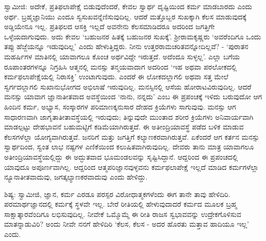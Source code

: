 ಸ್ವಾಮೀಜಿ: ಅದೇಕೆ, ಪ್ರತಿಫಲಾಪೇಕ್ಷೆ ಬಿಡುವುದೆಂದರೆ, ಕೇವಲ ಸ್ವಾರ್ಥ ದೃಷ್ಟಿಯಿಂದ ಕರ್ಮ ಮಾಡಬಾರದು ಎಂದು ಅರ್ಥ. ಬ್ರಹ್ಮಜ್ಞಾನಿಯು ಎಂದೂ ಸ್ವಸುಖವನ್ನೆಣಿಸುವುದಿಲ್ಲ. ಆದರೆ ಮತ್ತೊಬ್ಬರ ಸುಖಕ್ಕಾಗಿ ಕೆಲಸ ಮಾಡುವುದಕ್ಕೆ ಅಡ್ಡಿಯೇನೂ ಇಲ್ಲ. ಪ್ರತಿಫಲದ ಆಸಕ್ತಿ ಇಲ್ಲದೆ ಅವನೇನು ಕೆಲಸಮಾಡಿದರೂ ಅದರಿಂದ ಜಗತ್ತಿಗೇ ಒಳ್ಳೆಯದಾಗುವುದು. ಅದು ಕೇವಲ ‘ಬಹುಜನರ ಹಿತಕ್ಕೆ ಬಹುಜನರ ಸುಖಕ್ಕೆ’. ಶ‍್ರೀರಾಮಕೃಷ್ಣರು ‘ಅವರೆಂದಿಗೂ ಒಂದು ತಪ್ಪು ಹೆಜ್ಜೆಯನ್ನೂ ಇಡುವುದಿಲ್ಲ’ ಎಂದು ಹೇಳುತ್ತಿದ್ದರು. ನೀನು ಉತ್ತರರಾಮಚರಿತವನ್ನೋದಿಲ್ಲವೆ? - ‘ಪುರಾತನ ಮಹರ್ಷಿಗಳ ಮಾತಿನಲ್ಲಿ ಯಾವಾಗಲೂ ಕೊಂಚ ಅರ್ಥವಿದ್ದೇ ಇರುತ್ತದೆ. ಅದೆಂದೂ ಸುಳ್ಳಲ್ಲ’. ಎಲ್ಲಾ ಬಗೆಯ ರೂಪಾಂತರಗಳನ್ನೂ ನಿಗ್ರಹಿಸಿ ಆತ್ಮನಲ್ಲಿ ಮನಸ್ಸು ತನ್ಮಯವಾದಾಗ ಅದರಿಂದ ‘ಇಹ ಅಥವಾ ಪರಲೋಕದಲ್ಲಿ ಕರ್ಮಫಲಾಪೇಕ್ಷೆಯಲ್ಲಿ ನಿರಾಸಕ್ತಿ’ ಉಂಟಾಗುವುದು. ಎಂದರೆ ಈ ಲೋಕದಲ್ಲಾಗಲಿ ಅಥವಾ ಸತ್ತ ಮೇಲೆ ಸ್ವರ್ಗದಲ್ಲಾಗಲಿ ಸುಖಾನುಭೋಗದ ಅಭಿಲಾಷೆ ಇರುವುದಿಲ್ಲ. ಮನಸ್ಸಿನಲ್ಲಿ ಆಸೆಯ ಹೋರಾಟವಿರುವುದಿಲ್ಲ. ಆದರೆ ಮನಸ್ಸು ಯಾವಾಗ ಜ್ಞಾನಾತೀತವಾದ ಅವಸ್ಥೆಯಿಂದ ‘ನಾನು, ನನ್ನದು’ ಎಂಬ ಈ ಪ್ರಪಂಚಕ್ಕೆ ಇಳಿದು ಬರುವುದೋ ಆಗ ಹಿಂದಿನ ಕರ್ಮ, ಅಭ್ಯಾಸ, ಸಂಸ್ಕಾರಗಳ ಪರಿಮಾಣಕ್ಕನುಸಾರ ದೇಹದ ಕ್ರಿಯೆಗಳು ಸಾಗುವುವು. ಮನಸ್ಸು ಆಗ ಸಾಧಾರಣವಾಗಿ ಜಾಗೃತಾತೀತಾವಸ್ಥೆಯಲ್ಲಿ ಇರುವುದು; ತಿನ್ನುವುದೇ ಮುಂತಾದ ಶರೀರ ಕ್ರಿಯೆಗಳು ಅನಿವಾರ್ಯವಾಗಿ ಮಾಡಲ್ಪಟ್ಟು ದೇಹಭಾವನೆ ಬಹುಮಟ್ಟಿಗೆ ಕಡಿಮೆಯಾಗಿರುತ್ತದೆ. ಈ ಅತೀಂದ್ರಿಯಾವಸ್ಥೆ ಪಡೆದ ಬಳಿಕ ಮಾಡುವ ಕೆಲಸಗಳೆಲ್ಲಾ ಯೋಗ್ಯವಾಗಿರುತ್ತವೆ. ಜನರಿಗೆ ಮತ್ತು ಜಗತ್ತಿಗೆ ಕಲ್ಯಾಣಕರವಾಗಿರುತ್ತವೆ. ಏಕೆಂದರೆ ಆಗ ಕರ್ತನ ಮನಸ್ಸು ಸ್ವಾರ್ಥದಿಂದ, ಸ್ವಂತ ಲಾಭ ನಷ್ಟಗಳ ಎಣಿಕೆಯಿಂದ ಕಲುಷಿತವಾಗಿರುವುದಿಲ್ಲ. ದೇವರು ತಾನು ಮಾತ್ರ ಯಾವಾಗಲೂ ಅತೀಂದ್ರಿಯಾವಸ್ಥೆಯಲ್ಲಿದ್ದು ಈ ಅದ್ಭುತವಾದ ಭೂಮಂಡಲವನ್ನು ಸೃಷ್ಟಿಸಿದ್ದಾನೆ. ಆದ್ದರಿಂದ ಈ ಪ್ರಪಂಚದಲ್ಲಿ ಯಾವುದೂ ಅಪೂರ್ಣವಾಗಿಲ್ಲ. ಆದ್ದರಿಂದ ಆತ್ಮಪರಿಜ್ಞಾನವುಳ್ಳವನು ಕರ್ಮಫಲಾಪೇಕ್ಷೆ ಇಲ್ಲದೆ ಮಾಡಿದ ಕರ್ಮಗಳೆಲ್ಲಾ ನ್ಯೂನಾತೀತವಾದುವು, ಜಗತ್ಕಲ್ಯಾಣಕರವಾದುವು ಎಂದು ಹೇಳಿದ್ದು.

ಶಿಷ್ಯ: ಸ್ವಾಮೀಜಿ, ಜ್ಞಾನ, ಕರ್ಮ ಎರಡೂ ಪರಸ್ಪರ ವಿರೋಧಾತ್ಮಕಗಳೆಂದು ಈಗ ತಾನೇ ತಾವು ಹೇಳಿದಿರಿ. ಪರಮಾರ್ಥಜ್ಞಾನದಲ್ಲಿ ಕರ್ಮಕ್ಕೆ ಸ್ಥಳವೇ ಇಲ್ಲ. ಬೇರೆ ರೀತಿಯಲ್ಲಿ ಹೇಳುವುದಾದರೆ ಕರ್ಮದ ಮೂಲಕ ಬ್ರಹ್ಮ ಸಾಕ್ಷಾತ್ಕಾರವೆಂದಿಗೂ ಲಭಿಸುವುದಿಲ್ಲ. ನೀವೇಕೆ ಒಮ್ಮೊಮ್ಮೆ ಈ ರೀತಿ ರಾಜಸ ಸ್ವಭಾವವನ್ನು ಉದ್ರೇಕಗೊಳಿಸುವ ಮಾತನ್ನಾಡುವಿರಿ? ಅಂದು ನೀವೇ ನನಗೆ ಹೇಳಿದಿರಿ ‘ಕೆಲಸ, ಕೆಲಸ - ಅದರ ಹೊರತು ಮತ್ತಾವ ಹಾದಿಯೂ ಇಲ್ಲ’ ಎಂದು.

